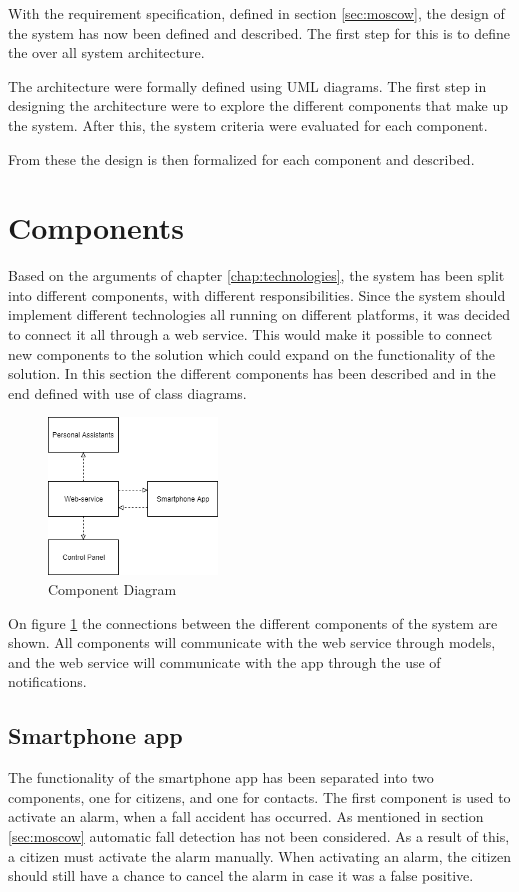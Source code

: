 \label{chap:system-arch}
With the requirement specification, defined in section \ref{sec:moscow}, the design of the system has now been defined and described. The first step for this is to define the over all system architecture. 

The architecture were formally defined using UML diagrams. The first step in designing the architecture were to explore the different components that make up the system. After this, the system criteria were evaluated for each component. 

From these the design is then formalized for each component and described.

\section{Components}
Based on the arguments of chapter \ref{chap:technologies}, the system has been split into different components, with different responsibilities. Since the system should implement different technologies all running on different platforms, it was decided to connect it all through a web service. This would make it possible to connect new components to the solution which could expand on the functionality of the solution. In this section the different components has been described and in the end defined with use of class diagrams.

\begin{figure}[H]
    \centering
    \includegraphics[width=0.4\textwidth]{Figures/deploymentdiagram.png}
    \caption{Component Diagram}
    \label{fig:componentsDiagram}
\end{figure}

On figure \ref{fig:componentsDiagram} the connections between the different components of the system are shown. All components will communicate with the web service through models, and the web service will communicate with the app through the use of notifications.

\subsection{Smartphone app}
The functionality of the smartphone app has been separated into two components, one for citizens, and one for contacts. The first component is used to activate an alarm, when a fall accident has occurred. As mentioned in section \ref{sec:moscow} automatic fall detection has not been considered. As a result of this, a citizen must activate the alarm manually. When activating an alarm, the citizen should still have a chance to cancel the alarm in case it was a false positive. 

